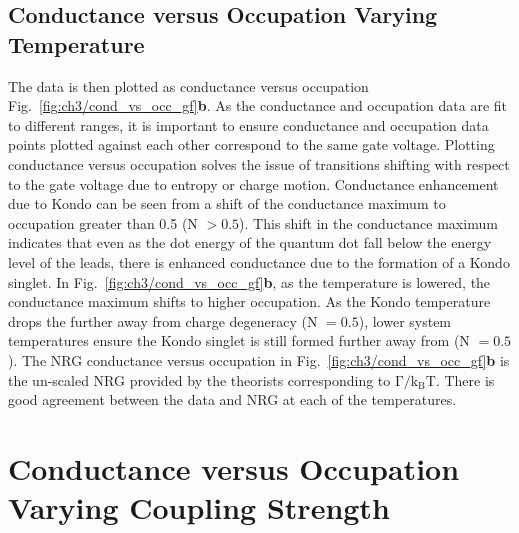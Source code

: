 \subsection{Conductance versus Occupation Varying Temperature}
The data is then plotted as conductance versus occupation Fig.~\ref{fig:ch3/cond_vs_occ_gf}\textbf{b}. As the conductance and occupation data are fit to different ranges, it is important to ensure conductance and occupation data points plotted against each other correspond to the same gate voltage. Plotting conductance versus occupation solves the issue of transitions shifting with respect to the gate voltage due to entropy or charge motion. Conductance enhancement due to Kondo can be seen from a shift of the conductance maximum to occupation greater than 0.5 (N $>0.5$). This shift in the conductance maximum indicates that even as the dot energy of the quantum dot fall below the energy level of the leads, there is enhanced conductance due to the formation of a Kondo singlet.  In Fig.~\ref{fig:ch3/cond_vs_occ_gf}\textbf{b}, as the temperature is lowered, the conductance maximum shifts to higher occupation. As the Kondo temperature drops the further away from charge degeneracy (N $=0.5$), lower system temperatures ensure the Kondo singlet is still formed further away from (N $=0.5$). The NRG conductance versus occupation in Fig.~\ref{fig:ch3/cond_vs_occ_gf}\textbf{b} is the un-scaled NRG provided by the theorists corresponding to $\mathrm{\Gamma/k_BT}$. There is good agreement between the data and NRG at each of the temperatures. 




\section{Conductance versus Occupation Varying Coupling Strength}


